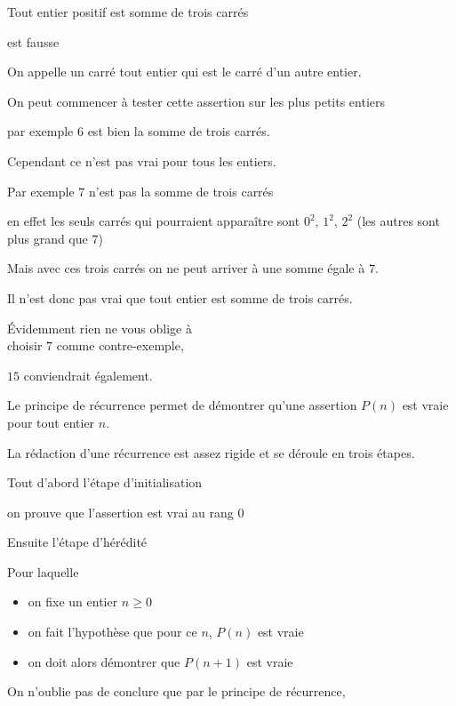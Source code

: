 \og Tout entier positif est somme de trois carrés\fg

est fausse

\change

On appelle un carré tout entier qui est le carré d'un autre entier.

On peut commencer à tester cette assertion sur les plus petits entiers

par exemple $6$ est bien la somme de trois carrés.


\change

Cependant ce n'est pas vrai pour tous les entiers.

Par exemple $7$ n'est pas la somme de trois carrés

\change


en effet les seuls carrés qui pourraient apparaître sont
$0^2$, $1^2$, $2^2$ (les autres sont plus grand que $7$)

Mais avec ces trois carrés on ne peut arriver à une somme 
égale à $7$.

Il n'est donc pas vrai que tout entier est somme de trois carrés.

Évidemment rien ne vous oblige à\\
choisir $7$ comme contre-exemple,

$15$ conviendrait également.


\diapo

Le principe de récurrence permet de démontrer
qu'une assertion $P(n)$ est vraie pour tout entier $n$.

La rédaction d'une récurrence est assez rigide et se déroule en
trois étapes.


\change

Tout d'abord l'étape d'initialisation 

on prouve que l'assertion est vrai au rang $0$

\change

Ensuite l'étape d'hérédité

Pour laquelle 
  \begin{itemize}
    \item on fixe un entier $n\ge 0$
    \item on fait l'hypothèse que pour ce $n$, $P(n)$ est vraie
    \item on doit alors démontrer que $P(n+1)$ est vraie
   \end{itemize}

\change

On n'oublie pas de conclure que par le principe de récurrence,

